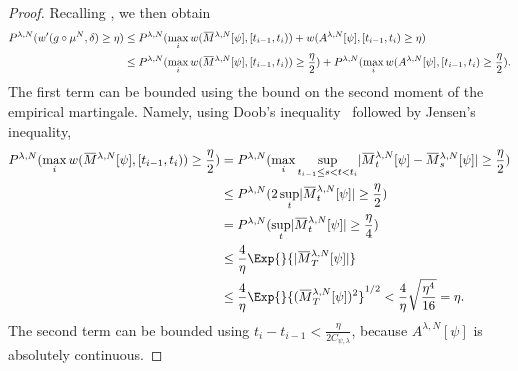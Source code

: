 \begin{proof}
  Recalling , we then obtain %
  \begin{equation}
    \begin{split}
      P^{\lambda, N} (w'(g \circ \mu^N, \delta) \geq \eta)
       & \leq P^{\lambda, N}( \max_i w(\ol{M}^{\lambda, N}[\psi], [t_{i-1}, t_i)) + w(A^{\lambda, N}[\psi], [t_{i-1}, t_i) \geq \eta)                                                        \\
       & \leq P^{\lambda, N}( \max_i w(\ol{M}^{\lambda, N}[\psi], [t_{i-1}, t_i)) \geq \frac{\eta}{2}) + P^{\lambda, N}( \max_i w(A^{\lambda, N}[\psi], [t_{i-1}, t_i) \geq \frac{\eta}{2}).
    \end{split}
  \end{equation}
  The first term can be bounded using the bound on the second moment of the empirical martingale.
  Namely, using Doob's inequality~\cite[64]{ethierMarkovProcessesCharacterization1985} followed by Jensen's inequality,
  \begin{equation}
    \begin{split}
      P^{\lambda, N}( \max_i w(\ol{M}^{\lambda, N}[\psi], [t_{i-1}, t_i)) \geq \frac{\eta}{2} )
       & = P^{\lambda, N}( \max_i \sup_{t_{i-1} \leq s < t < t_i} \abs{ \ol{M}_t^{\lambda, N}[\psi] - \ol{M}_s^{\lambda, N}[\psi] } \geq \frac{\eta}{2} ) \\
       & \leq P^{\lambda, N}( 2 \sup_{t} \abs{ \ol{M}_t^{\lambda, N}[\psi] } \geq \frac{\eta}{2} )                                                        \\
       & = P^{\lambda, N}( \sup_{t} \abs{ \ol{M}_t^{\lambda, N}[\psi] } \geq \frac{\eta}{4} )                                                             \\
       & \leq \frac{4}{\eta} \Exp{}{\abs{ \ol{M}_T^{\lambda, N}[\psi] }}                                                                                  \\
       & \leq \frac{4}{\eta} \Exp{}{ ( \ol{M}_T^{\lambda, N}[\psi] )^2 }^{1/2}
      < \frac{4}{\eta} \sqrt{\frac{\eta^4}{16}}
      = \eta.
    \end{split}
  \end{equation}
  The second term can be bounded using \( t_i - t_{i-1} < \frac{\eta}{2C_{\psi, \lambda}} \), because \( A^{\lambda, N}[\psi] \) is absolutely continuous.

\end{proof}
